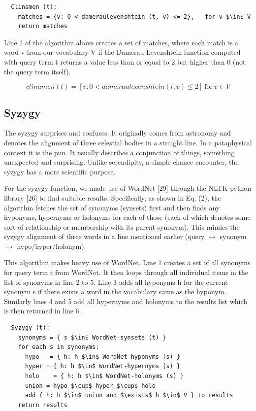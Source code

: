\begin{lstlisting}
  Clinamen (t):
    matches = {v: 0 < dameraulevenshtein (t, v) <= 2},   for v $\in$ V
    return matches
\end{lstlisting}

Line 1 of the algorithm above creates a set of matches, where each match is a word v from our vocabulary V if the Damerau-Levenshtein function computed with query term t returns a value less than or equal to 2 but higher than 0 (not the query term itself).

\begin{equation}
  clinamen(t) = [v \colon 0 < dameraulevenshtein(t,v) \leq 2] \ \text{for} \ v \in V
\label{eq:clinamen}
\end{equation}

\subsection{Syzygy}

The syzygy surprises and confuses. It originally comes from astronomy and denotes the alignment of three celestial bodies in a straight line. In a pataphysical context it is the pun. It usually describes a conjunction of things, something unexpected and surprising. Unlike serendipity, a simple chance encounter, the syzygy has a more scientific purpose.

For the syzygy function, we made use of WordNet [29] through the NLTK python library [26] to find suitable results. Specifically, as shown in Eq. (2), the algorithm fetches the set of synonyms (synsets) first and then finds any hyponyms, hypernyms or holonyms for each of those (each of which denotes some sort of relationship or membership with its parent synonym). This mimics the syzygy alignment of three words in a line mentioned earlier (query $\to$ synonym $\to$ hypo/hyper/holonym).

This algorithm makes heavy use of WordNet. Line 1 creates a set of all synonyms for query term t from WordNet. It then loops through all individual items in the list of synonyms in line 2 to 5. Line 3 adds all hyponyms h for the current synonym s if there exists a word in the vocabulary same as the hyponym. Similarly lines 4 and 5 add all hypernyms and holonyms to the results list which is then returned in line 6.

\begin{lstlisting}
  Syzygy (t):
    synonyms = { s $\in$ WordNet-synsets (t) }
    for each s in synonyms:
      hypo   = { h: h $\in$ WordNet-hyponyms (s) }
      hyper = { h: h $\in$ WordNet-hypernyms (s) }
      holo    = { h: h $\in$ WordNet-holonyms (s) }
      union = hypo $\cup$ hyper $\cup$ holo
      add { h: h $\in$ union and $\exists$ h $\in$ V } to results
    return results
\end{lstlisting}

